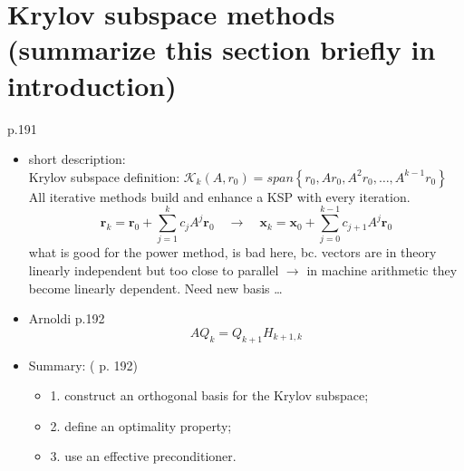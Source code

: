 \documentclass{scrartcl}
\begin{document}
\section*{Krylov subspace methods (summarize this section briefly in introduction)}

\cite{Ascher:2011:FCN:2031413} p.191\\
\begin{itemize}
\item short description:\\
Krylov subspace definition: $\mathcal{K}_k(A, r_0) = span \left\{ r_0, Ar_0, A^2r_0,\ldots,A^{k-1}r_0 \right\}$\\

All iterative methods build and enhance a KSP with every iteration.
\begin{equation*}
\textbf{r}_k = \textbf{r}_0 + \sum_{j=1}^{k} c_jA^j\textbf{r}_0 \quad \to \quad \textbf{x}_k = \textbf{x}_0 + \sum_{j=0}^{k-1} c_{j+1}A^j\textbf{r}_0
\end{equation*}
what is good for the power method, is bad here, bc. vectors are in theory linearly independent but too close to parallel $\to$ in machine arithmetic they become linearly dependent. Need new basis \ldots 
\item Arnoldi \cite{Ascher:2011:FCN:2031413} p.192
\begin{equation*}
AQ_k = Q_{k+1}H_{k+1,k}
\end{equation*}
\item Summary: (\cite{Ascher:2011:FCN:2031413} p. 192)
	\begin{itemize}
	\item 1. construct an orthogonal basis for the Krylov subspace;
	\item 2. define an optimality property;
	\item 3. use an effective preconditioner.
	\end{itemize}
\end{itemize}
\end{document}

